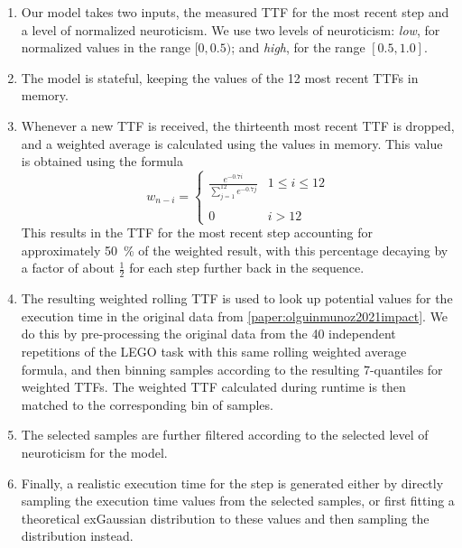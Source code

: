 \begin{enumerate}
    \item Our model takes two inputs, the measured \gls{TTF} for the most recent step and a level of normalized neuroticism.
    We use two levels of neuroticism: \emph{low}, for normalized values in the range \ensuremath{[0, 0.5)}; and \emph{high}, for the range \ensuremath{[0.5, 1.0]}.
    \item The model is stateful, keeping the values of the \num{12} most recent \glspl{TTF} in memory.
    \item Whenever a new \gls{TTF} is received, the thirteenth most recent \gls{TTF} is dropped, and a weighted average is calculated using the values in memory.
    This value is obtained using the formula
    \begin{equation}\label{eq:modelweights}
    w_{n - i} =
    \left\{ \begin{array}{ll}
                \frac{e^{-0.7 i}}{\sum\limits^{12}_{j=1} e^{-0.7 j}} & 1 \leq i \leq 12 \\
                & \\
                0 & i > 12
    \end{array} \right.
    \end{equation}
    This results in the \gls{TTF} for the most recent step accounting for approximately \SI{50}{\percent} of the weighted result, with this percentage decaying by a factor of about \ensuremath{\frac{1}{2}} for each step further back in the sequence.

    \item The resulting weighted rolling \gls{TTF} is used to look up potential values for the execution time in the original data from \cref{paper:olguinmunoz2021impact}.
    We do this by pre-processing the original data from the \num{40} independent repetitions of the LEGO task with this same rolling weighted average formula, and then binning samples according to the resulting \num{7}-quantiles for weighted \glspl{TTF}.
    The weighted \gls{TTF} calculated during runtime is then matched to the corresponding bin of samples.

    \item The selected samples are further filtered according to the selected level of neuroticism for the model.
    \item Finally, a realistic execution time for the step is generated either by directly sampling the execution time values from the selected samples, or first fitting a theoretical \gls{exGaussian} distribution to these values and then sampling the distribution instead.
\end{enumerate}


